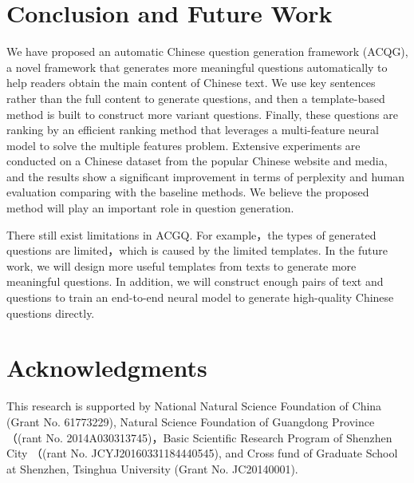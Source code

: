\documentclass[runningheads,UTF8,article]{comsis2}
\newcommand\revised[1]{{\color{red} #1}}
\begin{document}
	\section{Conclusion and Future Work}
	We have proposed an automatic Chinese question generation framework (ACQG), a novel framework that generates more meaningful questions automatically to help readers obtain the main content of Chinese text. We use key sentences rather than the full content to generate questions, and then a template-based method is built to construct more variant questions. Finally, these questions are ranking by an efficient ranking method that leverages a multi-feature neural model to solve the multiple features problem. Extensive experiments are conducted on a Chinese dataset from the popular Chinese website and media, and the results show a significant improvement in terms of perplexity and human evaluation comparing with the baseline methods. We believe the proposed method will play an important role in question generation. 
	
	\revised{
		There  still exist limitations in ACGQ. For example，the types of generated questions are limited，which is caused by the limited templates.
		In the future work, we will design more useful templates from texts to generate more meaningful questions. In addition, we will construct enough pairs of text and questions to train an end-to-end neural model to generate high-quality Chinese questions directly.}
	
	
	\section{Acknowledgments}
	
	
	This research is supported by National Natural Science Foundation of China (Grant No. 61773229), Natural Science Foundation of Guangdong Province （(rant No. 2014A030313745)，Basic Scientific Research Program of Shenzhen City （(rant No. JCYJ20160331184440545), and Cross fund of Graduate School at Shenzhen, Tsinghua University (Grant No. JC20140001).
	
	
	
	
	


	
	
\end{document}

